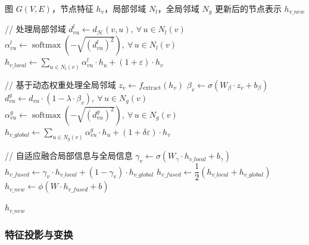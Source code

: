 \begin{algorithm}[H]
\caption{自适应融合双曲注意力}
\label{alg:hyperbolic_attention_formalized}
\begin{algorithmic}[1]
\REQUIRE 图 $G(V,E)$，节点特征 $h_v$，局部邻域 $N_l$，全局邻域 $N_g$
\ENSURE  更新后的节点表示 $h_{v\_new}$

\vspace{0.5em}
\STATE // 处理局部邻域
    \STATE $d_{vu}^{l} \leftarrow d_{\mathcal{H}}(v, u),\ \forall\, u \in N_l(v)$
    \STATE $\alpha_{vu}^{l} \leftarrow \operatorname{softmax}\!\left(-\sqrt{(d_{vu}^{l})^2}\right),\ \forall\, u \in N_l(v)$
    \STATE $h_{v\_local} \leftarrow \displaystyle\sum_{u \in N_l(v)}\alpha_{vu}^{l} \cdot h_u + (1+\varepsilon) \cdot h_v$
\ENDFOR

\vspace{0.5em}
\STATE // 基于动态权重处理全局邻域
    \STATE $z_v \leftarrow f_{\mathrm{extract}}(h_v)$
    \STATE $\beta_v \leftarrow \sigma(W_{\beta} \cdot z_v + b_{\beta})$
    \STATE $d_{vu}^{g} \leftarrow d_{vu} \cdot (1 - \lambda \cdot \beta_v),\ \forall\, u \in N_g(v)$
    \STATE $\alpha_{vu}^{g} \leftarrow \operatorname{softmax}\!\left(-\sqrt{(d_{vu}^{g})^2}\right),\ \forall\, u \in N_g(v)$
    \STATE $h_{v\_global} \leftarrow \displaystyle\sum_{u \in N_g(v)}\alpha_{vu}^{g} \cdot h_u + (1+\delta\varepsilon) \cdot h_v$
\ENDFOR

\vspace{0.5em}
\STATE // 自适应融合局部信息与全局信息
        \STATE $\gamma_v \leftarrow \sigma(W_{\gamma} \cdot h_{v\_local} + b_{\gamma})$
        \STATE $h_{v\_fused} \leftarrow \gamma_v \cdot h_{v\_local} + (1 - \gamma_v) \cdot h_{v\_global}$
    \ELSE
        \STATE $h_{v\_fused} \leftarrow \dfrac{1}{2}\!\left(h_{v\_local} + h_{v\_global}\right)$
    \ENDIF
    \STATE $h_{v\_new} \leftarrow \phi(W \cdot h_{v\_fused} + b)$
\ENDFOR

\RETURN $h_{v\_new}$
\end{algorithmic}
\end{algorithm}

\subsubsection{特征投影与变换}

